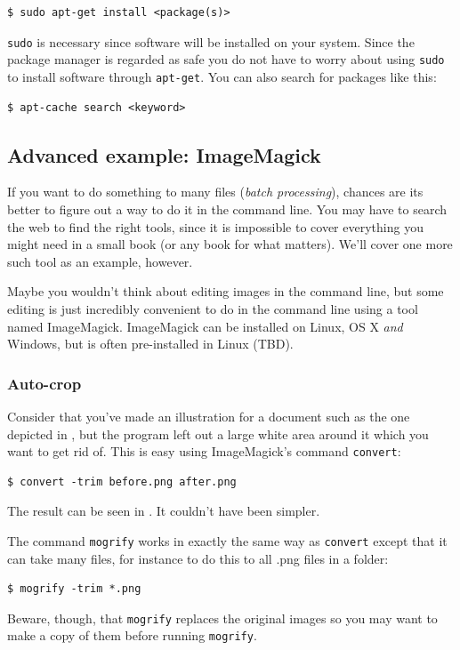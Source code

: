 \begin{verbatim}
$ sudo apt-get install <package(s)>
\end{verbatim}
\verb|sudo| is necessary since software will be installed on your system. Since the package manager is regarded as safe you do not have to worry about using \verb|sudo| to install software through \verb|apt-get|. You can also search for packages like this:

\begin{verbatim}
$ apt-cache search <keyword>
\end{verbatim}

\subsection{Advanced example: ImageMagick}\label{sec:bash:imagemagick}
If you want to do something to many files (\emph{batch processing}), chances are its better to figure out a way to do it in the command line. You may have to search the web to find the right tools, since it is impossible to cover everything you might need in a small book (or any book for what matters). We'll cover one more such tool as an example, however.

Maybe you wouldn't think about editing images in the command line, but some editing is just incredibly convenient to do in the command line using a tool named ImageMagick. ImageMagick can be installed on Linux, OS X \emph{and} Windows, but is often pre-installed in Linux (TBD).

\subsubsection{Auto-crop}
Consider that you've made an illustration for a document such as the one depicted in , but the program left out a large white area around it which you want to get rid of. This is easy using ImageMagick's command \verb|convert|:

\begin{verbatim}
$ convert -trim before.png after.png
\end{verbatim}
The result can be seen in . It couldn't have been simpler.

The command \verb|mogrify| works in exactly the same way as \verb|convert| except that it can take many files, for instance to do this to all .png files in a folder:

\begin{verbatim}
$ mogrify -trim *.png
\end{verbatim}
Beware, though, that \verb|mogrify| replaces the original images so you may want to make a copy of them before running \verb|mogrify|.

